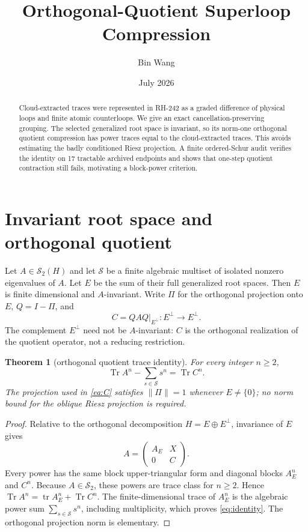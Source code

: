 \documentclass[11pt]{article}
\title{Orthogonal-Quotient Superloop Compression}
\author{Bin Wang}
\date{July 2026}
\newtheorem{theorem}{Theorem}
\newcommand{\Tr}{\operatorname{Tr}}
\newcommand{\Schatten}[1]{\mathcal S_{#1}}
\begin{document}
\maketitle

\begin{abstract}
Cloud-extracted traces were represented in RH-242 as a graded difference of
physical loops and finite atomic counterloops.  We give an exact
cancellation-preserving grouping.  The selected generalized root space is
invariant, so its norm-one orthogonal quotient compression has power traces
equal to the cloud-extracted traces.  This avoids estimating the badly
conditioned Riesz projection.  A finite ordered-Schur audit verifies the
identity on 17 tractable archived endpoints and shows that one-step quotient
contraction still fails, motivating a block-power criterion.
\end{abstract}

\section{Invariant root space and orthogonal quotient}

Let $A\in\Schatten{2}(H)$ and let $\mathcal S$ be a finite algebraic multiset
of isolated nonzero eigenvalues of $A$.  Let $E$ be the sum of their full
generalized root spaces.  Then $E$ is finite dimensional and $A$-invariant.
Write $\Pi$ for the orthogonal projection onto $E$, $Q=I-\Pi$, and
\begin{equation}\label{eq:C}
 C=QAQ\big|_{E^\perp}:E^\perp\longrightarrow E^\perp.
\end{equation}
The complement $E^\perp$ need not be $A$-invariant: $C$ is the orthogonal
realization of the quotient operator, not a reducing restriction.

\begin{theorem}[orthogonal quotient trace identity]\label{thm:quotient}
For every integer $n\ge2$,
\begin{equation}\label{eq:identity}
 \Tr A^n-\sum_{s\in\mathcal S}s^n=\Tr C^n.
\end{equation}
The projection used in \eqref{eq:C} satisfies $\|\Pi\|=1$ whenever
$E\ne\{0\}$; no norm bound for the oblique Riesz projection is required.
\end{theorem}

\begin{proof}
Relative to the orthogonal decomposition $H=E\oplus E^\perp$, invariance of
$E$ gives
\[
 A=\begin{pmatrix}A_E&X\\0&C\end{pmatrix}.
\]
Every power has the same block upper-triangular form and diagonal blocks
$A_E^n$ and $C^n$.  Because $A\in\Schatten{2}$, these powers are trace class
for $n\ge2$.  Hence
$\Tr A^n=\operatorname{tr}A_E^n+\Tr C^n$.  The finite-dimensional trace of
$A_E^n$ is the algebraic power sum $\sum_{s\in\mathcal S}s^n$, including
multiplicity, which proves \eqref{eq:identity}.  The orthogonal projection
norm is elementary.
\end{proof}
\end{document}

